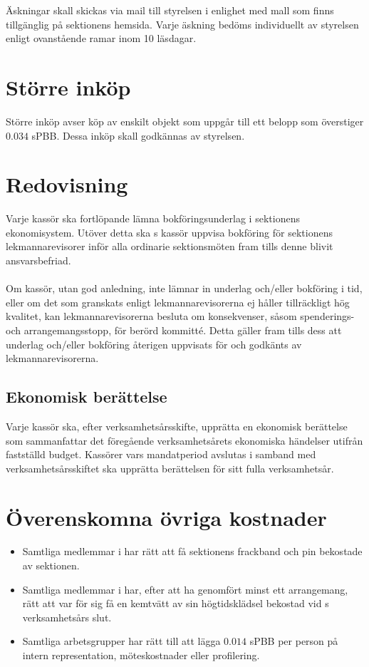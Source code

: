 \documentclass[11pt, includeaddress]{classes/cthit}
\begin{document}
Äskningar skall skickas via mail till styrelsen i enlighet med mall som finns tillgänglig på sektionens hemsida. Varje äskning bedöms individuellt av styrelsen enligt ovanstående ramar inom 10 läsdagar.

\section{Större inköp}
Större inköp avser köp av enskilt objekt som uppgår till ett belopp som överstiger $0.034$ sPBB. Dessa inköp skall godkännas av styrelsen.

\section{Redovisning}
Varje kassör ska fortlöpande lämna bokföringsunderlag i sektionens ekonomisystem. Utöver detta ska \STYRIT{}s kassör uppvisa bokföring för sektionens lekmannarevisorer inför alla ordinarie sektionsmöten fram tills denne blivit ansvarsbefriad.
\\\\
Om kassör, utan god anledning, inte lämnar in underlag och/eller bokföring i tid, eller om det som granskats enligt lekmannarevisorerna ej håller tillräckligt hög kvalitet, kan lekmannarevisorerna besluta om konsekvenser, såsom spenderings- och arrangemangsstopp, för berörd kommitté. Detta gäller fram tills dess att underlag och/eller bokföring återigen uppvisats för och godkänts av lekmannarevisorerna.
\subsection{Ekonomisk berättelse}
Varje kassör ska, efter verksamhetsårsskifte, upprätta en ekonomisk berättelse som sammanfattar det föregående verksamhetsårets ekonomiska händelser utifrån fastställd budget. Kassörer vars mandatperiod avslutas i samband med verksamhetsårsskiftet ska upprätta berättelsen för sitt fulla verksamhetsår.
\section{Överenskomna övriga kostnader}
\begin{itemize}
	\item Samtliga medlemmar i \FANBARERIT{} har rätt att få sektionens frackband och pin bekostade av sektionen.
	\item Samtliga medlemmar i \FANBARERIT{} har, efter att ha genomfört minst ett arrangemang, rätt att var för sig få en kemtvätt av sin högtidsklädsel bekostad vid \FANBARERIT{}s verksamhetsårs slut.
        \item Samtliga arbetsgrupper har rätt till att lägga $0.014$ sPBB per person på
intern representation, möteskostnader eller profilering.
\end{itemize}
\end{document}
